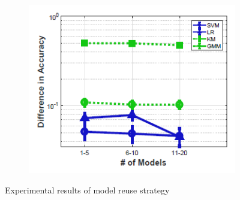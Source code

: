 \begin{figure}[h]
\begin{subfigure}{0.22\textwidth}
    \caption{}
    \label{fig:linview_matrix_powers3}
    \end{subfigure}
    \hfill
    \begin{subfigure}{0.22\textwidth}
        \includegraphics[height = 1.2\textwidth, width=1.2\textwidth]{Figures/model_reuse_coreset_accuracy.png}
    \caption{}
    \label{fig:linview_matrix_powers3}
    \end{subfigure}
    \caption{Experimental results of model reuse strategy}
\end{figure}


